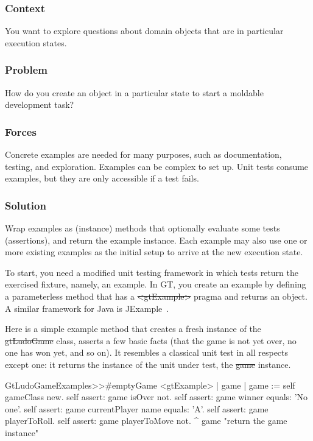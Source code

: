 \documentclass[sigconf]{acmart}
\begin{document}
\subsubsection*{Context}
You want to explore questions about domain objects that are in particular execution states.

\subsubsection*{Problem}
How do you create an object in a particular state to start a moldable development task?

\subsubsection*{Forces}
Concrete examples are needed for many purposes, such as documentation, testing, and exploration.
Examples can be complex to set up.
Unit tests consume examples, but they are only accessible if a test fails.

\subsubsection*{Solution}
Wrap examples as (instance) methods that optionally evaluate some tests (assertions), and return the example instance.
Each example may also use one or more existing examples as the initial setup to arrive at the new execution state.

To start, you need a modified unit testing framework in which tests return the exercised fixture, namely, an example.
In GT, you create an example by defining a parameterless method that has a \st{<gtExample>} pragma and returns an object.
A similar framework for Java is JExample~\cite{Kuhn08a}.

Here is a simple example method that creates a fresh instance of the \st{gtLudoGame} class, asserts a few basic facts (\ie that the game is not yet over, no one has won yet, and so on).
It resembles a classical unit test in all respects except one: it returns the instance of the unit under test, \ie the \st{game} instance.

\begin{code}
GtLudoGameExamples>>#emptyGame
	<gtExample>
	| game |
	game := self gameClass new.
	self assert: game isOver not.
	self assert: game winner equals: 'No one'.
	self assert: game currentPlayer name equals: 'A'.
	self assert: game playerToRoll.
	self assert: game playerToMove not.
	^ game  "return the game instance"
\end{code}
\end{document}
